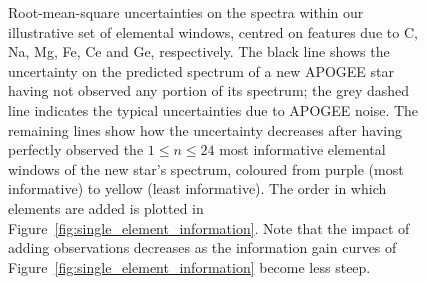 \documentclass[a4paper,fleqn,usenatbib]{mnras}
\begin{document}
\begin{figure}
    \caption{Root-mean-square uncertainties on the spectra within our illustrative set of elemental windows, centred on features due to C, Na, Mg, Fe, Ce and Ge, respectively. The black line shows the uncertainty on the predicted spectrum of a new APOGEE star having not observed any portion of its spectrum; the grey dashed line indicates the typical uncertainties due to APOGEE noise. The remaining lines show how the uncertainty decreases after having perfectly observed the $1 \le n \le 24$ most informative elemental windows of the new star's spectrum, coloured from purple (most informative) to yellow (least informative). The order in which elements are added is plotted in Figure~\ref{fig:single_element_information}. Note that the impact of adding observations decreases as the information gain curves of Figure~\ref{fig:single_element_information} become less steep.}
    \label{fig:single_element_errs}
\end{figure}
\end{document}
